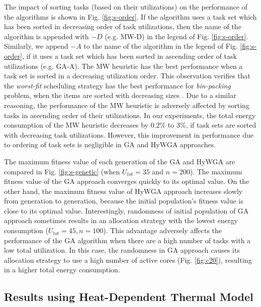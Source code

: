 \documentclass[conference]{IEEEtran}
\begin{document}
The impact of sorting tasks (based on their utilizations) on the performance of the algorithms is shown in Fig. \ref{fig:s-order}.
If the algorithm uses a task set which has been sorted in decreasing order of task utilizations, then the name of the algorithm is appended with $-D$ (e.g. MW-D)
in the legend of Fig. \ref{fig:s-order}.
Similarly, we append $-A$ to the name of the algorithm in the legend of Fig. \ref{fig:s-order}, if it uses a task set which has been 
sorted in ascending order of task utilizations (e.g. GA-A).
The MW heuristic has the best performance when a task set is sorted in a decreasing utilization order. 
This observation verifies that the \emph{worst-fit} scheduling strategy has the best performance for \emph{bin-packing} problem, when the 
items are sorted with decreasing sizes \cite{Aydin03}. Due to a similar reasoning, the performance of the MW heuristic is adversely affected 
by sorting tasks in ascending order of their utilizations.
In our experiments, the total energy consumption 
of the MW heuristic decreases by 0.2\% to 3\%, if task sets are sorted with decreasing task utilizations.
However, this improvement in performance due to ordering of task sets is %
negligible
in GA and HyWGA approaches. 


The maximum fitness value of each generation of the GA and HyWGA are compared in Fig. \ref{fig:s-genetic} (when $U_{tot}=35$ and $n=200$). 
The maximum fitness value of the GA approach
converges quickly to its optimal value. On the other hand, the maximum fitness value of HyWGA approach increases %
slowly from generation to generation, because the initial population's fitness value is  close to its optimal value.
Interestingly, randomness of initial population of GA approach sometimes results in an allocation strategy with the lowest energy consumption ($U_{tot}=45, n=100$). 
This advantage adversely affects the performance of the GA algorithm when there are a high number of tasks with a low total utilization. 
In this case, the randomness in GA approach causes its allocation strategy to use a high number of active cores (Fig. \ref{fig:c20}),
resulting in a higher total energy consumption. %


\subsection{Results using Heat-Dependent Thermal Model}
\end{document}
